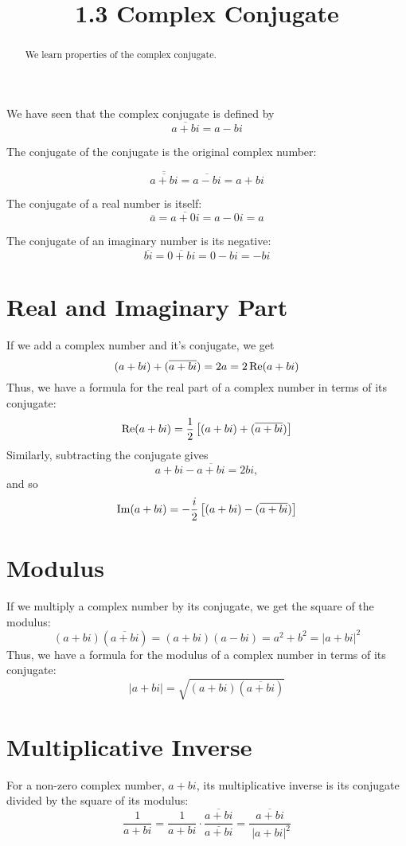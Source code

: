 \documentclass[handout]{ximera}
\title{1.3 Complex Conjugate}
\begin{document}
\begin{abstract}
We learn properties of the complex conjugate.
\end{abstract}

\maketitle



We have seen that the complex conjugate is defined by
\[
\overline{a+bi} = a-bi
\]

The conjugate of the conjugate is the original complex number:

\[
\overline{\overline{a+bi}} = \overline{a-bi} = a+bi
\]

The conjugate of a real number is itself:
\[
\overline{a}=\overline{a+0i} = a-0i = a
\]

The conjugate of an imaginary number is its negative:
\[
\overline{bi}=\overline{0+bi} = 0-bi = -bi
\]


\section{Real and Imaginary Part}


If we add a complex number and it's conjugate, we get
\[
(a+bi) + (\overline{a+bi}) = 2a = 2\operatorname{Re}(a+bi)
\]
Thus, we have a formula for the real part of a complex number in terms of its conjugate:
\[
\operatorname{Re}(a+bi) = \frac12 \left[(a+bi) + (\overline{a+bi})\right]
\]
Similarly, subtracting the conjugate gives 
\[
a+bi - \overline{a+bi} = 2bi,
\]
and so
\[
\operatorname{Im}(a+bi) = -\frac{i}{2}\left[(a+bi) - (\overline{a+bi})\right]
\]
 
\section{Modulus}

If we multiply a complex number by its conjugate, we get the square of the modulus:
\[
(a+bi)(\overline{a+bi}) = (a+bi)(a-bi) = a^2 + b^2 = |a+bi|^2
\]
Thus, we have a formula for the modulus of a complex number in terms of its conjugate:
\[
|a+bi|= \sqrt{(a+bi)(\overline{a+bi})}
\]


\section{Multiplicative Inverse}

For a non-zero complex number, $a+bi$, its multiplicative inverse is its conjugate divided by the square of its modulus:
\[
\frac{1}{a+bi} = \frac{1}{a+bi}\cdot \frac{\overline{a+bi}}{\overline{a+bi}} = \frac{\overline{a+bi}}{\ |a+bi|^2}
\]
\end{document}
